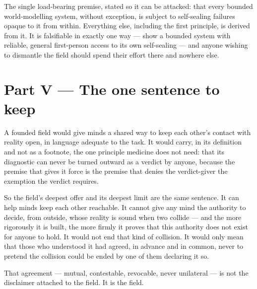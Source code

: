 \documentclass{article}
\begin{document}
The single load-bearing premise, stated so it can be attacked: that every bounded world-modelling system, without exception, is subject to self-sealing failures opaque to it from within. Everything else, including the first principle, is derived from it. It is falsifiable in exactly one way --- show a bounded system with reliable, general first-person access to its own self-sealing --- and anyone wishing to dismantle the field should spend their effort there and nowhere else.

\section*{Part V --- The one sentence to keep}

A founded field would give minds a shared way to keep each other's contact with reality open, in language adequate to the task. It would carry, in its definition and not as a footnote, the one principle medicine does not need: that its diagnostic can never be turned outward as a verdict by anyone, because the premise that gives it force is the premise that denies the verdict-giver the exemption the verdict requires.

So the field's deepest offer and its deepest limit are the same sentence. It can help minds keep each other reachable. It cannot give any mind the authority to decide, from outside, whose reality is sound when two collide --- and the more rigorously it is built, the more firmly it proves that this authority does not exist for anyone to hold. It would not end that kind of collision. It would only mean that those who understood it had agreed, in advance and in common, never to pretend the collision could be ended by one of them declaring it so.

That agreement --- mutual, contestable, revocable, never unilateral --- is not the disclaimer attached to the field. It is the field.
\end{document}
